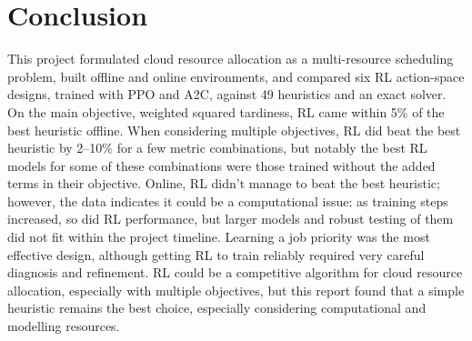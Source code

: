 \documentclass[12pt]{article}
\begin{document}
\section{Conclusion}\label{sec:conclusion}
This project formulated cloud resource allocation as a multi-resource scheduling problem, built offline and online environments, and compared six RL action-space designs, trained with PPO and A2C, against 49 heuristics and an exact solver. On the main objective, weighted squared tardiness, RL came within 5\% of the best heuristic offline. When considering multiple objectives, RL did beat the best heuristic by 2--10\% for a few metric combinations, but notably the best RL models for some of these combinations were those trained without the added terms in their objective. Online, RL didn't manage to beat the best heuristic; however, the data indicates it could be a computational issue: as training steps increased, so did RL performance, but larger models and robust testing of them did not fit within the project timeline. Learning a job priority was the most effective design, although getting RL to train reliably required very careful diagnosis and refinement. RL could be a competitive algorithm for cloud resource allocation, especially with multiple objectives, but this report found that a simple heuristic remains the best choice, especially considering computational and modelling resources.
\end{document}
